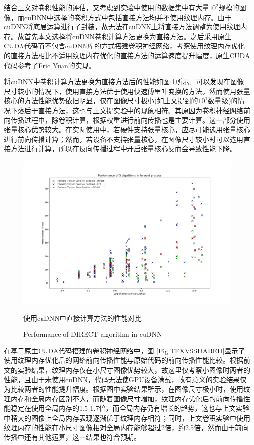 \par 结合上文对卷积性能的评估，又考虑到实验中使用的数据集中有大量$ 10^2 $规模的图像，而cuDNN中选择的卷积方式中包括直接方法均并不使用纹理内存。由于cuDNN将底层运算进行了封装，故无法在cuDNN上将直接方法调整为使用纹理内存。故首先本文选择将cuDNN卷积计算方法更换为直接方法。之后采用原生CUDA代码而不包含cuDNN库的方式搭建卷积神经网络，考察使用纹理内存优化的直接方法相比不适用纹理内存优化的直接方法的运算速度提升幅度，原生CUDA代码参考了Eric Yuan的实现\cite{ERICYUAN}。
\par 将cuDNN中卷积计算方法更换为直接方法后的性能如图 \ref{Fig.CNNDIRECT}所示。可以发现在图像尺寸较小的情况下，使用直接方法优于使用快速傅里叶变换的方法。然而使用张量核心的方法性能优势依旧明显，仅在图像尺寸极小(如上文提到的$ 10^1 $数量级)的情况下落后于直接方法，这也与上文提实验中的现象相符。其原因为卷积神经网络前向传播过程中，除卷积计算，根据权重进行前向传播也是主要计算。这一部分使用张量核心优势较大。在实际使用中，若硬件支持张量核心，应尽可能选用张量核心进行前向传播计算；然而，若设备不支持张量核心，在图像尺寸较小时可以选用直接方法进行计算，所以在反向传播过程中开启张量核心反而会导致性能下降。
\begin{figure}
	\centering
	\includegraphics[width=15cm]{figures/CNN-HALF-3ALGOFWD.jpg}
	\renewcommand{\thefigure}{\arabic{section}-\arabic{figure} }
	\renewcommand{\figurename}{图}
	\caption{使用cuDNN中直接计算方法的性能对比}
	\addtocounter{figure}{-1}
	\renewcommand{\thefigure}{\arabic{section}-\arabic{figure} }
	\renewcommand{\figurename}{Figure}
	\caption{Performance of DIRECT algorithm in cuDNN}
	\label{Fig.CNNDIRECT}
\end{figure}
\par 在基于原生CUDA代码搭建的卷积神经网络中，图 \ref{Fig.TEXVSSHARED}显示了使用纹理内存优化后的网络前向传播性能与原始代码的前向传播性能比较。根据前文的实验结果，纹理内存仅在小尺寸图像优势较大，故这里仅考察小图像时两者的性能，且由于未使用cuDNN，代码无法使GPU设备满载，故有意义的实验结果仅为比较两者的性能提升幅度。根据图中实验结果所示，在图像尺寸极小时，使用纹理内存和全局内存区别不大，而随着图像尺寸增加，纹理内存优化后的前向传播性能稳定在使用全局内存的1.5-1.7倍，而全局内存仍有增长的趋势，这也与上文实验中稍大的图像上全局内存表现逐渐优于纹理内存相符；同时，上文卷积实验中使用纹理内存的性能在小尺寸图像相对全局内存能够超过2倍，约2.5倍，然而由于前向传播中还有其他运算，这一结果也符合预期。
